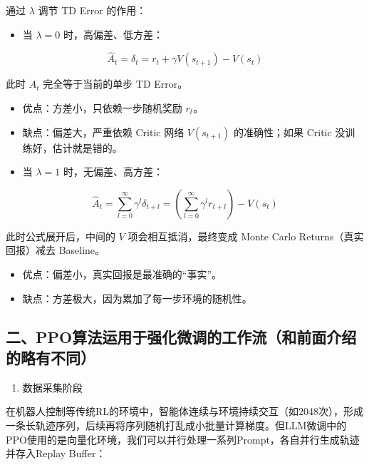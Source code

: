 通过 \(\lambda\) 调节 TD Error 的作用：

\begin{itemize}
\tightlist
\item
  当 \(\lambda = 0\) 时，高偏差、低方差：
\end{itemize}

\[
\hat{A}_t = \delta_t = r_t + \gamma V(s_{t+1}) - V(s_t)
\]

此时 \(A_t\) 完全等于当前的单步 TD Error。

\begin{itemize}
\tightlist
\item
  优点：方差小，只依赖一步随机奖励 \(r_t\)。
\item
  缺点：偏差大，严重依赖 Critic 网络 \(V(s_{t+1})\) 的准确性；如果 Critic 没训练好，估计就是错的。
\item
  当 \(\lambda = 1\) 时，无偏差、高方差：
\end{itemize}

\[
\hat{A}_t
=
\sum_{l=0}^{\infty}\gamma^l\delta_{t+l}
=
\left(\sum_{l=0}^{\infty}\gamma^l r_{t+l}\right)
- V(s_t)
\]

此时公式展开后，中间的 \(V\) 项会相互抵消，最终变成 Monte Carlo Returns（真实回报）减去 Baseline。

\begin{itemize}
\tightlist
\item
  优点：偏差小，真实回报是最准确的``事实''。
\item
  缺点：方差极大，因为累加了每一步环境的随机性。
\end{itemize}

\hypertarget{ux4e8cppoux7b97ux6cd5ux8fd0ux7528ux4e8eux5f3aux5316ux5faeux8c03ux7684ux5de5ux4f5cux6d41ux548cux524dux9762ux4ecbux7ecdux7684ux7565ux6709ux4e0dux540c}{%
\subsection{二、PPO算法运用于强化微调的工作流（和前面介绍的略有不同）}\label{ux4e8cppoux7b97ux6cd5ux8fd0ux7528ux4e8eux5f3aux5316ux5faeux8c03ux7684ux5de5ux4f5cux6d41ux548cux524dux9762ux4ecbux7ecdux7684ux7565ux6709ux4e0dux540c}}

\begin{enumerate}
\def\labelenumi{\arabic{enumi}.}
\tightlist
\item
  数据采集阶段
\end{enumerate}

在机器人控制等传统RL的环境中，智能体连续与环境持续交互（如2048次），形成一条长轨迹序列，后续再将序列随机打乱成小批量计算梯度。但LLM微调中的PPO使用的是向量化环境，我们可以并行处理一系列Prompt，各自并行生成轨迹并存入Replay Buffer：

